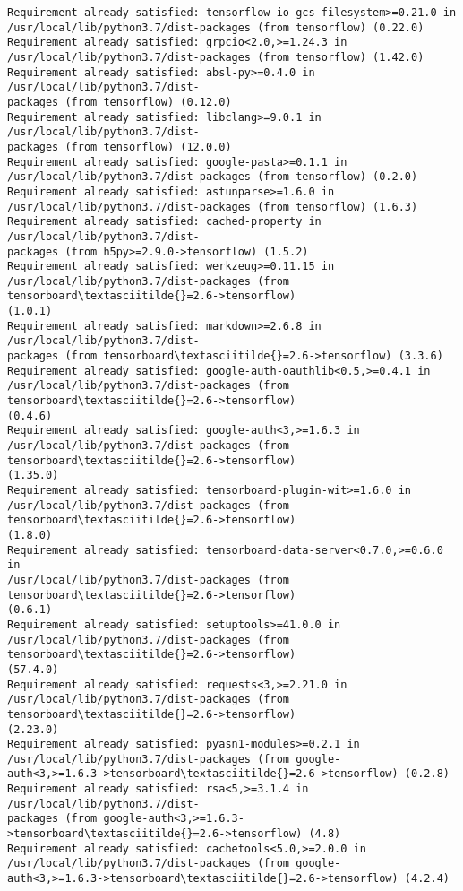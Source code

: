\documentclass[11pt]{article}
\begin{document}
\begin{Verbatim}[commandchars=\\\{\}]
Requirement already satisfied: tensorflow-io-gcs-filesystem>=0.21.0 in
/usr/local/lib/python3.7/dist-packages (from tensorflow) (0.22.0)
Requirement already satisfied: grpcio<2.0,>=1.24.3 in
/usr/local/lib/python3.7/dist-packages (from tensorflow) (1.42.0)
Requirement already satisfied: absl-py>=0.4.0 in /usr/local/lib/python3.7/dist-
packages (from tensorflow) (0.12.0)
Requirement already satisfied: libclang>=9.0.1 in /usr/local/lib/python3.7/dist-
packages (from tensorflow) (12.0.0)
Requirement already satisfied: google-pasta>=0.1.1 in
/usr/local/lib/python3.7/dist-packages (from tensorflow) (0.2.0)
Requirement already satisfied: astunparse>=1.6.0 in
/usr/local/lib/python3.7/dist-packages (from tensorflow) (1.6.3)
Requirement already satisfied: cached-property in /usr/local/lib/python3.7/dist-
packages (from h5py>=2.9.0->tensorflow) (1.5.2)
Requirement already satisfied: werkzeug>=0.11.15 in
/usr/local/lib/python3.7/dist-packages (from tensorboard\textasciitilde{}=2.6->tensorflow)
(1.0.1)
Requirement already satisfied: markdown>=2.6.8 in /usr/local/lib/python3.7/dist-
packages (from tensorboard\textasciitilde{}=2.6->tensorflow) (3.3.6)
Requirement already satisfied: google-auth-oauthlib<0.5,>=0.4.1 in
/usr/local/lib/python3.7/dist-packages (from tensorboard\textasciitilde{}=2.6->tensorflow)
(0.4.6)
Requirement already satisfied: google-auth<3,>=1.6.3 in
/usr/local/lib/python3.7/dist-packages (from tensorboard\textasciitilde{}=2.6->tensorflow)
(1.35.0)
Requirement already satisfied: tensorboard-plugin-wit>=1.6.0 in
/usr/local/lib/python3.7/dist-packages (from tensorboard\textasciitilde{}=2.6->tensorflow)
(1.8.0)
Requirement already satisfied: tensorboard-data-server<0.7.0,>=0.6.0 in
/usr/local/lib/python3.7/dist-packages (from tensorboard\textasciitilde{}=2.6->tensorflow)
(0.6.1)
Requirement already satisfied: setuptools>=41.0.0 in
/usr/local/lib/python3.7/dist-packages (from tensorboard\textasciitilde{}=2.6->tensorflow)
(57.4.0)
Requirement already satisfied: requests<3,>=2.21.0 in
/usr/local/lib/python3.7/dist-packages (from tensorboard\textasciitilde{}=2.6->tensorflow)
(2.23.0)
Requirement already satisfied: pyasn1-modules>=0.2.1 in
/usr/local/lib/python3.7/dist-packages (from google-
auth<3,>=1.6.3->tensorboard\textasciitilde{}=2.6->tensorflow) (0.2.8)
Requirement already satisfied: rsa<5,>=3.1.4 in /usr/local/lib/python3.7/dist-
packages (from google-auth<3,>=1.6.3->tensorboard\textasciitilde{}=2.6->tensorflow) (4.8)
Requirement already satisfied: cachetools<5.0,>=2.0.0 in
/usr/local/lib/python3.7/dist-packages (from google-
auth<3,>=1.6.3->tensorboard\textasciitilde{}=2.6->tensorflow) (4.2.4)

\end{Verbatim}
\end{document}
